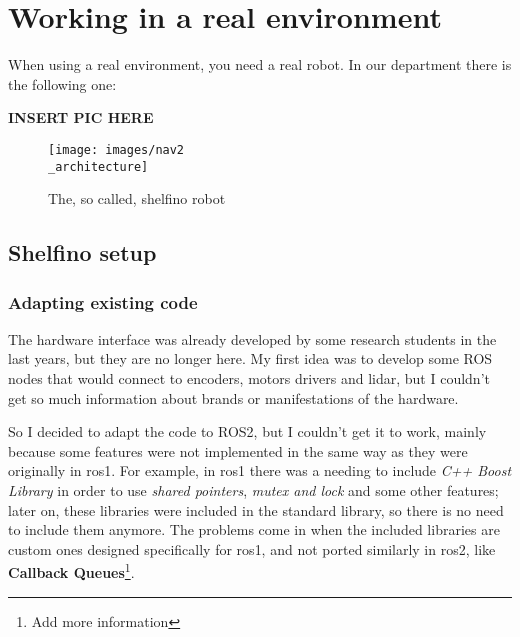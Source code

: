  

\chapter{Working in a real environment}

\label{cha:realworld}

When using a real environment, you need a real robot. In our department there is the following one:

{\bf INSERT PIC HERE}

\begin{figure}[h]
  \centering
  \texttt{[image: images/nav2\\\_architecture]}
  \caption{The, so called, shelfino robot}
  \label{fig:shelfino}
\end{figure}



\section{Shelfino setup} 

\subsection{Adapting existing code}

The hardware interface was already developed by some research students in the last years, but they are no longer here. My first idea was to develop some ROS nodes that would connect to encoders, motors drivers and lidar, but I couldn't get so much information about brands or manifestations of the hardware.

So I decided to adapt the code to ROS2, but I couldn't get it to work, mainly because some features were not implemented in the same way as they were originally in \acrshort{ros}1. For example, in \acrshort{ros}1 there was a needing to include {\it C++ Boost Library} in order to use {\it shared pointers}, {\it mutex and lock} and some other features; later on, these libraries were included in the standard library, so there is no need to include them anymore.
The problems come in when the included libraries are custom ones designed specifically for \acrshort{ros}1, and not ported similarly in \acrshort{ros}2, like {\bf Callback Queues}\footnote{Add more information}\cite{migrationguide}.

